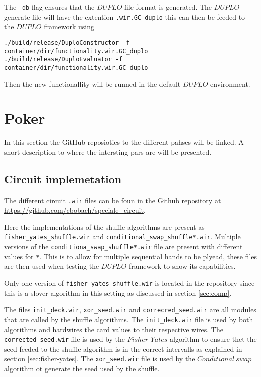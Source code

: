 \documentclass[twoside,11pt,openright]{report}
\begin{document}
\begin{appendices}
The \verb|-db| flag ensures that the $DUPLO$ file format is generated. The $DUPLO$ generate file will have the extention \verb|.wir.GC_duplo| this can then be feeded to the $DUPLO$ framework using

\begin{center}
\begin{verbatim}
./build/release/DuploConstructor -f container/dir/functionality.wir.GC_duplo
./build/release/DuploEvaluator -f container/dir/functionality.wir.GC_duplo
\end{verbatim}
\end{center}

Then the new functionallity will be runned in the default $DUPLO$ environment.

\section{Poker}
\label{app:poker}
In this section the GitHub reposioties to the different pahses will be linked. A short description to where the intersting pars are will be presented.

\subsection{Circuit implemetation}
\label{app:circuit-impl}
The different circuit \verb|.wir| files can be foun in the Github repository at \url{https://github.com/cbobach/speciale_circuit}.

Here the implementations of the shuffle algorithms are present as \verb|fisher_yates_shuffle.wir| and \verb|conditional_swap_shuffle*.wir|. Multiple versions of the \verb|conditiona_swap_shuffle*.wir| file are present with different values for \verb|*|. This is to allow for multiple sequential hands to be plyead, these files are then used when testing the $DUPLO$ framework to show its capabilities.

Only one version of \verb|fisher_yates_shuffle.wir| is located in the repository since this is a slover algorithm in this setting as discussed in section \ref{sec:comp}.

The files \verb|init_deck.wir|, \verb|xor_seed.wir| and \verb|correcred_seed.wir| are all modules that are called by the shuffle algorithms. The \verb|init_deck.wir| file is used by both algorithms and hardwires the card values to their respective wires. The \verb|corrected_seed.wir| file is used by the $Fisher\text{-}Yates$ algorithm to ensure thet the seed feeded to the shuffle algorithm is in the correct intervalls as explained in section \ref{sec:fisher-yates}. The \verb|xor_seed.wir| file is used by the $Conditional~swap$ algorithm ot generate the seed used by the shuffle.


\end{appendices}
\end{document}
